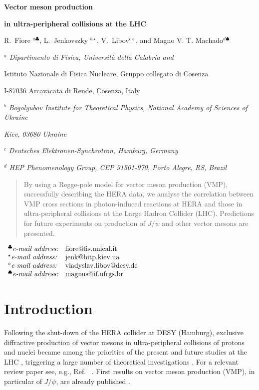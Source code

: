 \documentclass[12pt]{article}
\begin{document}
\vskip 0.5cm \centerline{\bf\Large Vector meson production}
\centerline{\bf\Large in ultra-peripheral collisions at the LHC}  \vskip 0.3cm
\centerline{R.~Fiore $^{a\clubsuit}$, L.~Jenkovszky $^{b\star}$, V.~Libov$^{c\diamond}$, and Magno V. T. Machado$^{d\spadesuit}$}

\vskip 1cm

\centerline{$^a$ \sl Dipartimento di Fisica, Universit\`a  della Calabria and}
\centerline{Istituto Nazionale di Fisica Nucleare, Gruppo collegato di Cosenza}
\centerline{I-87036 Arcavacata di Rende, Cosenza, Italy}
\centerline{$^b$ \sl Bogolyubov Institute for Theoretical Physics,
National Academy of Sciences of Ukraine} \centerline{\sl Kiev,
03680 Ukraine}
\centerline{$^c$ \sl Deutsches Elektronen-Synchrotron, Hamburg, Germany}
\centerline{$^d$ \sl HEP Phenomenology Group, CEP 91501-970, Porto Alegre, RS, Brazil}
\vskip
0.1cm

\begin{abstract}\noindent
By using a Regge-pole model for vector meson production (VMP), successfully describing the HERA data, we analyse the correlation between VMP cross sections in photon-induced reactions at HERA and those in ultra-peripheral collisions at the Large Hadron Collider (LHC).
Predictions for future experiments on production of $J/\psi$ and other vector mesons are presented.
\end{abstract}

\vskip 0.1cm

$
\begin{array}{ll}
^{\clubsuit}\mbox{{\it e-mail address:}} &
\mbox{fiore@fis.unical.it}\\
^{\star}\mbox{{\it e-mail address:}} &
   \mbox{jenk@bitp.kiev.ua} \\
^{\diamond}\mbox{{\it e-mail address:}} &
   \mbox{vladyslav.libov@desy.de} \\
 ^{\spadesuit}\mbox{{\it e-mail address:}} &
\mbox{magnus@if.ufrgs.br}\\  

\end{array}
$


\section{Introduction}\label{Int}

Following the shut-down of the HERA collider at DESY (Hamburg), exclusive diffractive production of vector mesons in ultra-peripheral collisions of protons and nuclei became among the priorities of the present and future studies at the LHC \cite{LHCb1, LHCb2}, triggering a large number of theoretical investigations \cite{Schafer, Brazil, Ryskin, Motyka, Szczurek}.
For a relevant review paper see, e.g., Ref.~ \cite{Review}.
First results on vector meson production (VMP), in particular of $J/\psi$, are already published \cite{LHCb1, LHCb2}.
\end{document}
